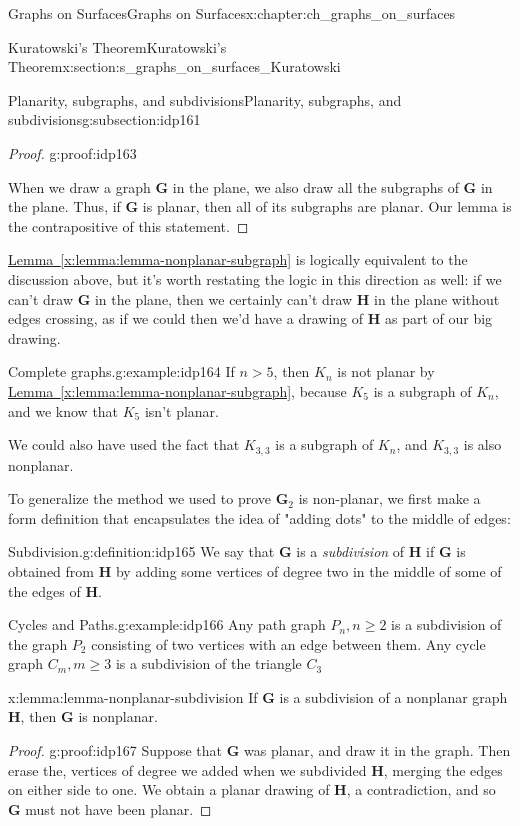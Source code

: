 \documentclass[oneside,10pt,]{book}
\newcommand{\xreffont}{\relax}
\numberwithin{equation}{section}
\newcommand{\bfG}{\mathbf{G}}
\newcommand{\bfH}{\mathbf{H}}
\newcommand{\gt}{>}
\begin{document}
\begin{chapterptx}{Graphs on Surfaces}{}{Graphs on Surfaces}{}{}{x:chapter:ch_graphs_on_surfaces}
\begin{sectionptx}{Kuratowski's Theorem}{}{Kuratowski's Theorem}{}{}{x:section:s_graphs_on_surfaces_Kuratowski}
\begin{subsectionptx}{Planarity, subgraphs, and subdivisions}{}{Planarity, subgraphs, and subdivisions}{}{}{g:subsection:idp161}
\begin{proof}{}{g:proof:idp163}
\par
When we draw a graph \(\bfG\) in the plane, we also draw all the subgraphs of \(\bfG\) in the plane.  Thus, if \(\bfG\) is planar, then all of its subgraphs are planar.  Our lemma is the contrapositive of this statement.%
\end{proof}
\hyperref[x:lemma:lemma-nonplanar-subgraph]{Lemma~{\xreffont\ref{x:lemma:lemma-nonplanar-subgraph}}} is logically equivalent to the discussion above, but it's worth restating the logic in this direction as well: if we can't draw \(\bfG\) in the plane, then we certainly can't draw \(\bfH\) in the plane without edges crossing, as if we could then we'd have a drawing of \(\bfH\) as part of our big drawing.%
\begin{example}{Complete graphs.}{g:example:idp164}%
If \(n\gt 5\), then \(K_n\) is not planar by \hyperref[x:lemma:lemma-nonplanar-subgraph]{Lemma~{\xreffont\ref{x:lemma:lemma-nonplanar-subgraph}}}, because \(K_5\) is a subgraph of \(K_n\), and we know that \(K_5\) isn't planar.%
\par
We could also have used the fact that \(K_{3,3}\) is a subgraph of \(K_n\), and \(K_{3,3}\) is also nonplanar.%
\end{example}
To generalize the method we used to prove \(\bfG_2\) is non-planar, we first make a form definition that encapsulates the idea of "adding dots" to the middle of edges:%
\begin{definition}{Subdivision.}{g:definition:idp165}%
We say that \(\bfG\) is a \emph{subdivision} of \(\bfH\) if \(\bfG\) is obtained from \(\bfH\) by adding some vertices of degree two in the middle of some of the edges of \(\bfH\).%
\end{definition}
\begin{example}{Cycles and Paths.}{g:example:idp166}%
Any path graph \(P_n, n\geq 2\) is a subdivision of the graph \(P_2\) consisting of two vertices with an edge between them.  Any cycle graph \(C_m, m\geq 3\) is a subdivision of the triangle \(C_3\)%
\end{example}
\begin{lemma}{}{}{x:lemma:lemma-nonplanar-subdivision}%
If \(\bfG\) is a subdivision of a nonplanar graph \(\bfH\), then \(\bfG\) is nonplanar.%
\end{lemma}
\begin{proof}{}{g:proof:idp167}
Suppose that \(\bfG\) was planar, and draw it in the graph.  Then erase the, vertices of degree we added when we subdivided \(\bfH\), merging the edges on either side to one.  We obtain a planar drawing of \(\bfH\), a contradiction, and so \(\bfG\) must not have been planar.%

\end{proof}
\end{subsectionptx}
\end{sectionptx}
\end{chapterptx}
\end{document}
